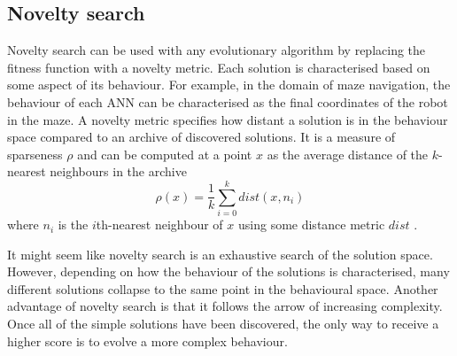 \subsection{Novelty search}
Novelty search can be used with any evolutionary algorithm by replacing the fitness
function with a novelty metric. Each solution is characterised based on some aspect
of its behaviour. For example, in the domain of maze navigation,
the behaviour of each ANN can be characterised as the
final coordinates of the robot in the maze. A novelty metric specifies how distant a solution
is in the behaviour space compared to an archive of discovered solutions. It is a measure
of sparseness $\rho$ and can be computed at a point $x$ as the average distance of the
$k$-nearest neighbours in the archive
\[
    \rho(x) = \frac{1}{k} \sum_{i=0}^{k} dist(x, n_{i})
\]
where $n_{i}$ is the $i$th-nearest neighbour of $x$ using some distance metric $dist$ \cite{novelty_alone}.

It might seem like novelty search is an exhaustive search of the solution space. However,
depending on how the behaviour of the solutions is characterised, many different solutions
collapse to the same point in the behavioural space. Another advantage of novelty search
is that it follows the arrow of increasing complexity. Once all of the simple solutions
have been discovered, the only way to receive a higher score is to evolve a more complex
behaviour.